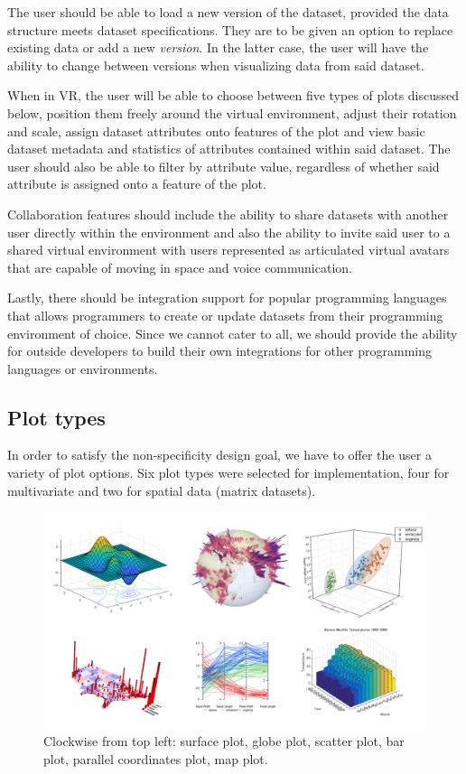 \documentclass[thesis=M,english,hidelinks]{FITthesisXE}[2012/06/26]
\begin{document}
The user should be able to load a new version of the dataset, provided the data structure meets dataset specifications. They are to be given an option to replace existing data or add a new \emph{version}. In the latter case, the user will have the ability to change between versions when visualizing data from said dataset.

When in VR, the user will be able to choose between five types of plots discussed below, position them freely around the virtual environment, adjust their rotation and scale, assign dataset attributes onto features of the plot and view basic dataset metadata and statistics of attributes contained within said dataset. The user should also be able to filter by attribute value, regardless of whether said attribute is assigned onto a feature of the plot.

Collaboration features should include the ability to share datasets with another user directly within the environment and also the ability to invite said user to a shared virtual environment with users represented as articulated virtual avatars that are capable of moving in space and voice communication.

Lastly, there should be integration support for popular programming languages that allows programmers to create or update datasets from their programming environment of choice. Since we cannot cater to all, we should provide the ability for outside developers to build their own integrations for other programming languages or environments.

\subsection{Plot types}

In order to satisfy the non-specificity design goal, we have to offer the user a variety of plot options. Six plot types were selected for implementation, four for multivariate and two for spatial data (matrix datasets).

\begin{figure}[ht]
\centering
\includegraphics[scale=0.2]{plot_types}
\caption{Clockwise from top left: surface plot, globe plot, scatter plot, bar plot, parallel coordinates plot, map plot.}
\label{fig:plot_types}
\end{figure}
\end{document}
